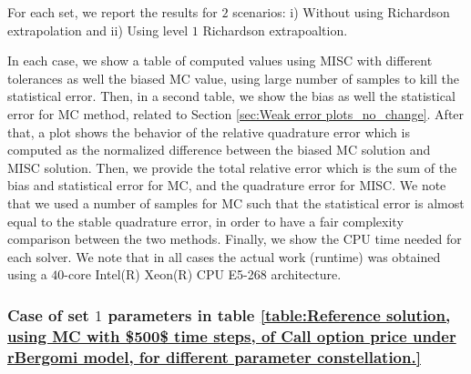  For each set,  we report the results for $2$ scenarios: i) Without using Richardson extrapolation and  ii) Using level $1$ Richardson extrapoaltion.

In each case, we show a table of computed values using MISC with different tolerances as well the biased MC value, using large number of samples to kill the statistical error. Then, in a second table,  we show the bias as well the statistical error for MC method, related to Section \ref{sec:Weak error plots_no_change}. After that, a plot  shows the behavior of  the relative quadrature error which is computed as the normalized difference between the biased MC solution and MISC solution. Then, we provide the total relative error which is the sum of the bias and statistical error for MC, and the quadrature error for MISC. We note that we used a number of samples for MC such that the statistical error is almost equal to the stable quadrature error, in order to have a fair complexity comparison between the two methods. Finally, we show the CPU time needed for each solver. We note that  in all cases the actual work (runtime) was obtained using a $40$-core Intel(R) Xeon(R) CPU E5-268 architecture.

\subsubsection{Case of set $1$ parameters in table \ref{table:Reference solution, using MC with $500$ time steps, of Call option price under rBergomi model, for different parameter constellation.}}\label{sec:Case of set 1 parameters}

